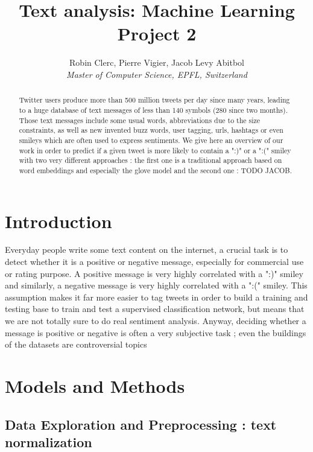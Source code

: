 \documentclass[10pt,conference,compsocconf]{IEEEtran}
\begin{document}
\title{Text analysis: Machine Learning Project 2}

\author{
  Robin Clerc, Pierre Vigier, Jacob Levy Abitbol\\
  \textit{Master of Computer Science, EPFL, Switzerland}
}

\maketitle

\begin{abstract}
Twitter users produce more than 500 million tweets per day since many years, leading to a huge database of text messages of less than 140 symbols (280 since two months). Those text messages include some usual words, abbreviations due to the size constraints, as well as new invented buzz words, user tagging, urls, hashtags or even smileys which are often used to express sentiments. We give here an overview of our work in order to predict if a given tweet is more likely to contain a ":)" or a ":(" smiley with two very different approaches : the first one is a traditional approach based on word embeddings and especially the glove model and the second one : TODO JACOB.
\end{abstract}

\section{Introduction}

Everyday people write some text content on the internet, a crucial task is to detect whether it is a positive or negative message, especially for commercial use or rating purpose. A positive message is very highly correlated with a ":)" smiley and similarly, a negative message is very highly correlated with a ":(" smiley. This assumption makes it far more easier to tag tweets in order to build a training and testing base to train and test a supervised classification network, but means that we are not totally sure to do real sentiment analysis. Anyway, deciding whether a message is positive or negative is often a very subjective task ; even the buildings of the datasets are controversial topics

\section{Models and Methods}
\label{sec:structure-paper}

\subsection{Data Exploration and Preprocessing : text normalization}
\end{document}
